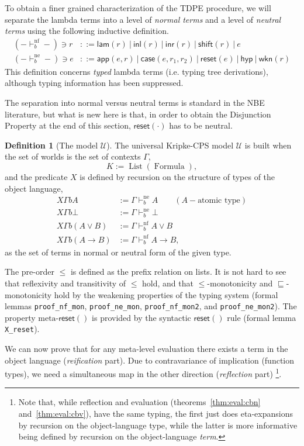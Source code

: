 \documentclass{eptcs}
\newcommand{\hyp}{\mathsf{hyp}}
\newcommand{\wkn}[1]{\mathsf{wkn}{(#1)}}
\newcommand{\inl}[1]{\mathsf{inl}{(#1)}}
\newcommand{\inr}[1]{\mathsf{inr}{(#1)}}
\newcommand{\lam}[1]{\mathsf{lam}{(#1)}}
\newcommand{\reset}[1]{\mathsf{reset}{(#1)}}
\newcommand{\shift}[1]{\mathsf{shift}{(#1)}}
\newcommand{\casemy}[3]{\mathsf{case}({#1},{#2},{#3})}
\newcommand{\app}[2]{\mathsf{app}({#1},{#2})}
\DeclareMathOperator{\Formula}{Formula}
\DeclareMathOperator{\List}{List}
\newcommand{\normal}{{\!\!\text{nf}}}
\newcommand{\neutral}{{\!\!\text{ne}}}
\newcommand{\Universal}{\mathcal{U}}
\theoremstyle{definition}
\newtheorem{definition}{Definition}[section]
\theoremstyle{plain}
\theoremstyle{remark}
\begin{document}
To obtain a finer grained characterization of the TDPE procedure, we will separate the lambda terms into a level of \emph{normal terms} and a level of \emph{neutral terms} using the following inductive definition.
\begin{align*}
(-\vdash^\normal_b-) \ni r &::= \lam{r} ~|~ \inl{r} ~|~ \inr{r} ~|~ \shift{r} ~|~ e \\
(-\vdash^\neutral_b-) \ni e &::= \app{e}{r} ~|~ \casemy{e}{r_1}{r_2} ~|~ \reset{e} ~|~ \hyp ~|~ \wkn{r}
\end{align*}
This definition concerns \emph{typed} lambda terms (i.e. typing tree derivations), although typing information has been suppressed.

The separation into normal versus neutral terms is standard in the NBE literature, but what is new here is that, in order to obtain the Disjunction Property at the end of this section, $\reset{\cdot}$ has to be neutral.

\begin{definition}[The model $\Universal$] The universal Kripke-CPS model $\Universal$ is built when the set of worlds is the set of contexts $\Gamma$,
\[
K := \List(\Formula),
\]
and the predicate $X$ is defined by recursion on the structure of types of the object language,
\begin{align*}
  X \Gamma b A &:= \Gamma \vdash^\neutral_b A \qquad (A -\text{atomic type})\\
  X \Gamma b \bot &:= \Gamma \vdash^\neutral_b \bot\\
  X \Gamma b (A \vee B) &:= \Gamma \vdash^\normal_b A\vee B \\
  X \Gamma b (A \to B) &:= \Gamma \vdash^\normal_b A\to B,
\end{align*}
as the set of terms in normal or neutral form of the given type.

The pre-order $\le$ is defined as the prefix relation on lists. It is not hard to see that reflexivity and transitivity of $\le$ hold, and that $\le$-monotonicity and $\sqsubseteq$-monotonicity hold by the weakening properties of the typing system (formal lemmas \texttt{proof\_nf\_mon}, \texttt{proof\_ne\_mon}, \texttt{proof\_nf\_mon2}, and \texttt{proof\_ne\_mon2}). The property $\text{meta-}\reset{}$ is provided by the syntactic $\reset{}$ rule (formal lemma \texttt{X\_reset}).
\end{definition}

We can now prove that for any meta-level evaluation there exists a term in the object language (\emph{reification} part). Due to contravariance of implication (function types), we need a simultaneous map in the other direction (\emph{reflection} part) \footnote{Note that, while reflection and evaluation (theorems~\ref{thm:eval:cbn} and~\ref{thm:eval:cbv}), have the same typing, the first just does eta-expansions by recursion on the object-language type, while the latter is more informative being defined by recursion on the object-language \emph{term}. }.
\end{document}
